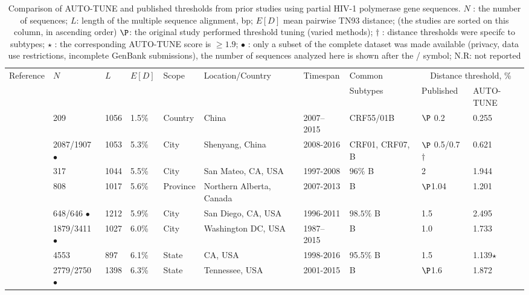 \documentclass[utf8]{FrontiersinHarvard} %
\begin{document}
\begin{table}[h]
	\caption{Comparison of AUTO-TUNE and published thresholds from prior studies using partial HIV-1 polymerase gene sequences. $N$ : the number of sequences; $L$: length of the multiple sequence alignment, bp; $E[D]$ mean pairwise TN93 distance; (the studies are sorted on this column, in ascending order) $\P$: the original study performed threshold tuning (varied methods); $\dagger$ : distance thresholds were specifc to subtypes; $\star$ : the corresponding AUTO-TUNE score is $\geq 1.9$; $\bullet$ : only a subset of the complete dataset was made available (privacy, data use restrictions, incomplete GenBank submissions), the number of  sequences analyzed here is shown after the / symbol; N.R: not reported}
	
	\vspace{10pt}
	\centering
	\begin{ssmall}
	\label{tab:paperComparison}
	\begin{tabular}{llllllllll}
	   \hline
		Reference     & $N$ & $L$ & $E[D]$ & Scope & Location/Country      & Timespan & Common & \multicolumn{2}{c}{Distance threshold, \%}\\
		     &  &       &  &  & & & Subtypes & Published & AUTO-TUNE \\
		\hline
		\cite{Zai:2020aa} & 209 & 1056 & 1.5\% & Country & China & 2007–2015 & CRF55/01B & $\P$ 0.2 & 0.255 \\
		\cite{liu_dynamics_2020}  & 2087/1907 $\bullet$  & 1053 & 5.3\% & City & Shenyang, China        & 2008-2016       & CRF01, CRF07, B&  $\P$ 0.5/0.7 $\dagger$ & 0.621  \\
		\cite{dalai_combining_2018} & 317 & 1044 & 5.5\% & City & San Mateo, CA, USA          & 1997-2008       & $96\%$ B & 2            & 1.944   \\
		\cite{chato_public_2020} & 808 & 1017 &  5.6\% & Province & Northern Alberta, Canada & 2007-2013 &  B & $\P$1.04 & 1.201 \\
		\cite{Little:2014aa} & 648/646 $\bullet$ & 1212 & 5.9\%& City & San Diego, CA, USA & 1996-2011 &  $98.5\%$ B & 1.5 &  2.495\\
		\cite{Perez-Losada:2017aa} & 1879/3411 $\bullet$  & 1027 & 6.0\% & City & Washington DC, USA & 1987–2015 & B & 1.0 & 1.733 \\
		\cite{rhee_national_2019} & 4553 & 897& 6.1\% & State & CA, USA          & 1998-2016       & 95.5\% B & 1.5          & 1.139$\star$   \\
		\cite{chato_public_2020} & 2779/2750 $\bullet$  & 1398 &  6.3\% & State &Tennessee, USA & 2001-2015 &  B & $\P$1.6 & 1.872 \\

\end{tabular}
\end{ssmall}
\end{table}
\end{document}

